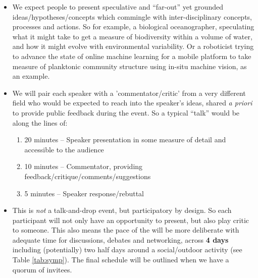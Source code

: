 \begin{itemize}

\item We expect people to present speculative and ``far-out'' yet
  grounded ideas/hypotheses/concepts which commingle with
  inter-disciplinary concepts, processes and actions. So for example,
  a biological oceanographer, speculating what it might take to get a
  measure of biodiversity within a volume of water, and how it might
  evolve with environmental variability. Or a roboticist trying to
  advance the state of online machine learning for a mobile platform
  to take measure of planktonic community structure using in-situ
  machine vision, as an example. 

\item We will pair each speaker with a 'commentator/critic' from a
  very different field who would be expected to reach into the
  speaker's ideas, shared \emph{a priori} to provide public feedback
  during the event. So a typical ``talk'' would be along the lines of:

  \begin{enumerate}

    \item 20 minutes -- Speaker presentation in some measure of
      detail and accessible to the audience
    \item 10 minutes -- Commentator, providing
      feedback/critique/comments/suggestions
    \item 5 minutes -- Speaker response/rebuttal

  \end{enumerate}

\item This is \emph{not} a talk-and-drop event, but participatory by
  design. So each participant will not only have an opportunity to
  present, but also play critic to someone. This also means the pace
  of the \symp will be more deliberate with adequate time for
  discussions, debates and networking, across \textbf{4 days}
  including (potentially) two half days around a social/outdoor
  activity (see Table \ref{tab:symp}). The final schedule will be
  outlined when we have a quorum of invitees.



\end{itemize}
